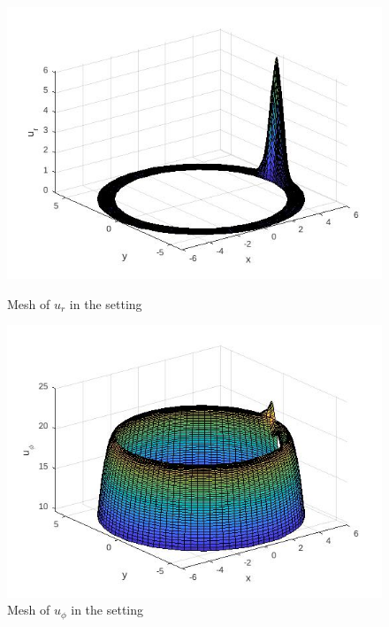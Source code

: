 \documentclass[12pt,a4paper]{report}
\begin{document}
\begin{figure}[H]
\centering
\begin{minipage}{.5\textwidth}
  \centering
  \includegraphics[width=1.2\linewidth]{MeshUrFcircle.jpg} 
  \caption{Mesh of \(u_r\) in the setting}
  \label{fig:plot3}
\end{minipage}%
\begin{minipage}{.5\textwidth}
  \centering
  \includegraphics[width=1.2\linewidth]{MeshUphiFcircle.jpg}
  \caption{Mesh of \(u_{\phi}\) in the setting}
  \label{fig:plot4}
\end{minipage}
\end{figure}
\end{document}
